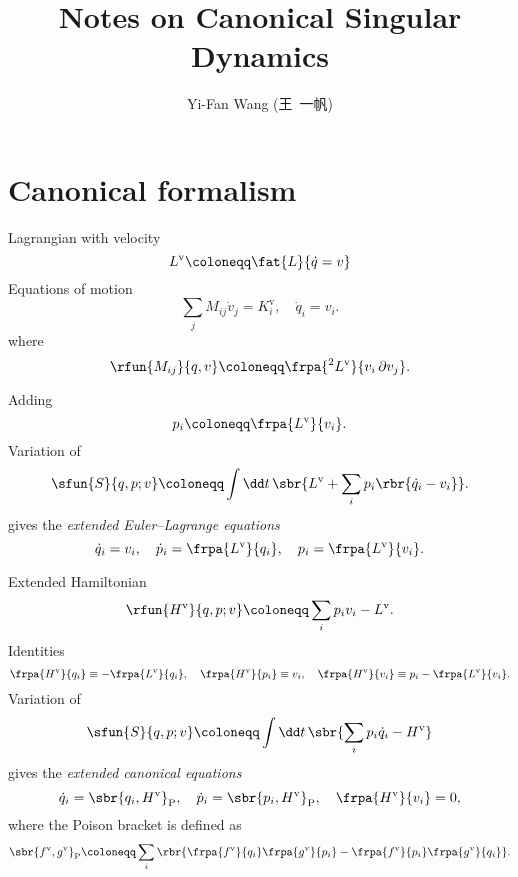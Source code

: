 \documentclass[a4paper,11pt]{article}
\title{Notes on Canonical Singular Dynamics}
\author{Yi-Fan Wang (王\ 一帆)}
\begin{document}
\maketitle

\section{Canonical formalism}

Lagrangian with velocity
\begin{equation}
L^\text{v} \coloneqq \fat{L}{\dot{q} = v}
\end{equation}
Equations of motion
\begin{equation}
\sum_j M_{ij}\dot{v}_j = K^\text{v}_i,\quad
\dot{q}_i = v_i.
\end{equation}
where
\begin{equation}
\rfun{M_{ij}}{q,v} \coloneqq \frpa{^2 L^\text{v}}{v_i\,\partial v_j}.
\end{equation}

Adding
\begin{equation}
p_i \coloneqq \frpa{L^\text{v}}{v_i}.%
\end{equation}
Variation of
\begin{equation}
\sfun{S}{q, p; v} \coloneqq \int\dd t\,\sbr{L^\text{v} + \sum_i 
p_i\rbr{\dot{q}_i - v_i}}.
\end{equation}
gives the \emph{extended Euler--Lagrange equations}
\begin{equation}
\dot{q}_i = v_i,\quad
\dot{p}_i = \frpa{L^\text{v}}{q_i},\quad
p_i = \frpa{L^\text{v}}{v_i}.
\end{equation}

Extended Hamiltonian
\begin{equation}
\rfun{H^\text{v}}{q, p; v} \coloneqq \sum_i p_i v_i - L^\text{v}.
\end{equation}
Identities
\begin{equation}
\frpa{H^\text{v}}{q_i} \equiv - \frpa{L^\text{v}}{q_i},\quad
\frpa{H^\text{v}}{p_i} \equiv v_i,\quad
\frpa{H^\text{v}}{v_i} \equiv p_i - \frpa{L^\text{v}}{v_i}.
\end{equation}
Variation of
\begin{equation}
\sfun{S}{q, p; v} \coloneqq \int\dd t\,\sbr{\sum_i 
p_i \dot{q}_i - H^\text{v}}
\end{equation}
gives the \emph{extended canonical equations}
\begin{equation}
\dot{q}_i = \sbr{q_i, H^\text{v}}_\text{P},\quad
\dot{p}_i = \sbr{p_i, H^\text{v}}_\text{P},\quad
\frpa{H^\text{v}}{v_i} = 0,
\end{equation}
where the Poison bracket is defined as
\begin{equation}
\sbr{f^\text{v}, g^\text{v}}_\text{P} \coloneqq 
\sum_i\rbr{\frpa{f^\text{v}}{q_i}\frpa{g^\text{v}}{p_i} -
\frpa{f^\text{v}}{p_i}\frpa{g^\text{v}}{q_i}}.
\end{equation}
\end{document}
